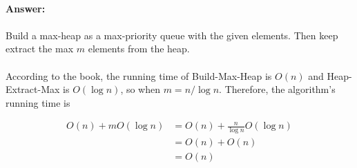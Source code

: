 \documentclass{article}
\begin{document}
\paragraph{Answer:}

\paragraph{}
Build a max-heap as a max-priority queue with the given elements. Then keep extract the max $m$ elements from the heap.

\paragraph{}
According to the book, the running time of Build-Max-Heap is $O(n)$ and Heap-Extract-Max is $O(\log n)$, so when $m=n/\log n$. Therefore, the algorithm's running time is

$$\begin{aligned}
O(n)+mO(\log n)&=O(n)+\frac{n}{\log n}O(\log n)\\
&=O(n)+O(n)\\
&=O(n)
\end{aligned}$$
\end{document}
